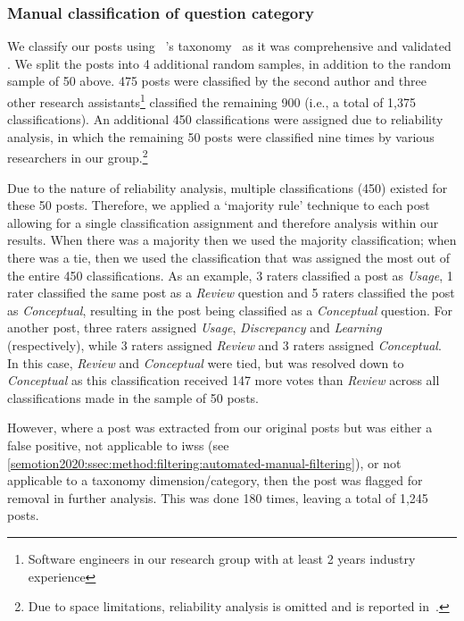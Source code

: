 \subsubsection{Manual classification of question category}
\label{semotion2020:ssec:method:filtering:classification}

We classify our \SEMNumPostsFromSO{} posts using ~\citeauthor{Beyer:2018fm}'s taxonomy~\citep{Beyer:2018fm} as it was comprehensive and validated \citep{Cummaudo:2020icse}. We split the posts into 4 additional random samples, in addition to the random sample of 50 above. 475 posts were classified by the second author and three other research assistants\footnote{Software engineers in our research group with at least 2 years industry experience} classified the remaining 900 (i.e., a total of 1,375 classifications). An additional 450 classifications were assigned due to reliability analysis, in which the remaining 50 posts were classified nine times by various researchers in our group.\footnote{Due to space limitations, reliability analysis is omitted and is reported in~\citep{Cummaudo:2020icse}.}  

Due to the nature of reliability analysis, multiple classifications (450) existed for  these 50 posts. Therefore, we applied a `majority rule' technique to each post allowing for a single classification assignment and therefore analysis within our results. When there was a majority then we used the majority classification; when there was a tie, then we used the classification that was assigned the most out of the entire 450 classifications. As an example, 3 raters classified a post as \textit{ Usage}, 1 rater classified the same post as a \textit{Review} question and 5 raters classified the post as \textit{Conceptual}, resulting in the post being classified as a \textit{Conceptual} question. For another post, three raters assigned \textit{ Usage}, \textit{Discrepancy} and \textit{Learning} (respectively), while 3 raters assigned \textit{Review} and 3 raters assigned \textit{Conceptual}. In this case, \textit{Review} and \textit{Conceptual} were tied, but was resolved down to \textit{Conceptual} as this classification received 147 more votes than \textit{Review} across all classifications made in the sample of 50 posts.

However, where a post was extracted from our original \SEMNumPostsFromSO{} posts but was either a false positive, not applicable to \glspl{iws} (see \cref{semotion2020:ssec:method:filtering:automated-manual-filtering}), or not applicable to a taxonomy dimension/category, then the post was flagged for removal in further analysis. This was done 180 times, leaving a total of 1,245 posts.

